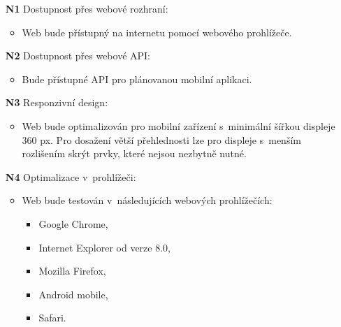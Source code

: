 \begin{itemize}
    \item[\textbf{N1}] Dostupnost přes webové rozhraní:
        \begin{itemize}
            \item Web bude přístupný na internetu pomocí webového prohlížeče.
        \end{itemize}
    \item[\textbf{N2}] Dostupnost přes webové API:
        \begin{itemize}
            \item Bude přístupné API pro plánovanou mobilní aplikaci.
        \end{itemize}
    \item[\textbf{N3}] Responzivní design:
        \begin{itemize}
            \item Web bude optimalizován pro mobilní zařízení s~minimální šířkou displeje 360 px. Pro dosažení větší přehlednosti lze pro displeje s~menším rozlišením skrýt prvky, které nejsou nezbytně nutné.
        \end{itemize}
    \item[\textbf{N4}] Optimalizace v~prohlížeči:
        \begin{itemize}
            \item Web bude testován v~následujících webových prohlížečích:
                \begin{itemize}
                    \item Google Chrome,
                    \item Internet Explorer od verze 8.0,
                    \item Mozilla Firefox,
                    \item Android mobile,
                    \item Safari.
                \end{itemize}
        \end{itemize}
\end{itemize}